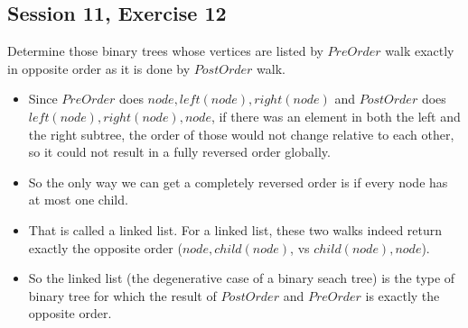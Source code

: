 \subsection {Session 11, Exercise 12}


Determine those binary trees whose vertices are listed by $PreOrder$ walk exactly in opposite order as it is
done by $PostOrder$ walk.


\begin{itemize}
    \item Since $PreOrder$ does $node, left(node), right(node)$ and $PostOrder$ does $left(node), right(node), node$, if there was an element in both the left and the right subtree, the order of those would not change relative to each other, so it could not result in a fully reversed order globally.
    \item So the only way we can get a completely reversed order is if every node has at most one child.
    \item That is called a linked list. For a linked list, these two walks indeed return exactly the opposite order ($node, child(node)$, vs $child(node), node$).
    \item So the linked list (the degenerative case of a binary seach tree) is the type of binary tree for which the result of $PostOrder$ and $PreOrder$ is exactly the opposite order.
\end{itemize}

